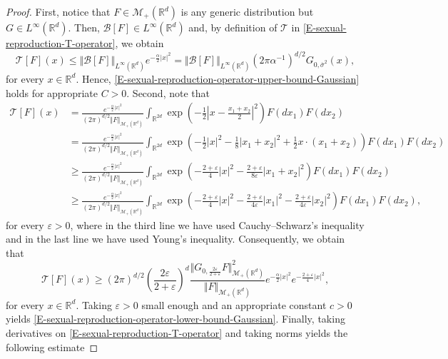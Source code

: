 \documentclass[reqno]{amsart}
\numberwithin{equation}{section}
\begin{document}
{\begin{proof} First, notice that $F\in \mathcal{M}_+(\mathbb{R}^d)$ is any generic distribution but $G\in L^\infty(\mathbb{R}^d)$. Then, $\mathcal{B}[F]\in L^\infty(\mathbb{R}^d)$ and, by definition of $\mathcal{T}$ in \eqref{E-sexual-reproduction-T-operator}, we obtain
$$
\mathcal{T}[F](x)\leq \Vert \mathcal{B}[F]\Vert_{L^\infty(\mathbb{R}^d)} e^{-\frac{\alpha}{2}\vert x\vert^2}= \Vert \mathcal{B}[F]\Vert_{L^\infty(\mathbb{R}^d)}\left(2\pi\alpha^{-1}\right)^{d/2} G_{0,\overline{\sigma}^2}(x),
$$
for every $x\in \mathbb{R}^d$. Hence, \eqref{E-sexual-reproduction-operator-upper-bound-Gaussian} holds for appropriate $C>0$. Second, note that
\begin{align*}
\mathcal{T}[F](x)&=\frac{e^{-\frac{\alpha}{2}\vert x\vert^2}}{(2\pi)^{d/2}\Vert F\Vert_{\mathcal{M}_+(\mathbb{R}^d)}}\int_{\mathbb{R}^{2d}}\exp\left(-\frac{1}{2}\left\vert x-\frac{x_1+x_2}{2}\right\vert^2 \right) F(dx_1)F(dx_2)\\
&=\frac{e^{-\frac{\alpha}{2}\vert x\vert^2}}{(2\pi)^{d/2}\Vert F\Vert_{\mathcal{M}_+(\mathbb{R}^d)}}\int_{\mathbb{R}^{2d}}\exp\left(-\frac{1}{2}\vert x\vert^2-\frac{1}{8}\vert x_1+x_2\vert^2+\frac{1}{2}x\cdot (x_1+x_2)\right)F(dx_1)F(dx_2)\\
&\geq \frac{e^{-\frac{\alpha}{2}\vert x\vert^2}}{(2\pi)^{d/2}\Vert F\Vert_{\mathcal{M}_+(\mathbb{R}^d)}}\int_{\mathbb{R}^{2d}} \exp\left(-\frac{2+\varepsilon}{4}\vert x\vert^2-\frac{2+\varepsilon}{8\varepsilon}\vert x_1+x_2\vert^2\right)F(dx_1)F(dx_2)\\
&\geq \frac{e^{-\frac{\alpha}{2}\vert x\vert^2}}{(2\pi)^{d/2}\Vert F\Vert_{\mathcal{M}_+(\mathbb{R}^d)}}\int_{\mathbb{R}^{2d}} \exp\left(-\frac{2+\varepsilon}{4}\vert x\vert^2-\frac{2+\varepsilon}{4\varepsilon}\vert x_1\vert^2-\frac{2+\varepsilon}{4\varepsilon}\vert x_2\vert^2\right)F(dx_1)F(dx_2),
\end{align*}
for every $\varepsilon>0$, where in  the third line we have used Cauchy--Schwarz's inequality and in the last line we have used Young's inequality. Consequently, we obtain that
$$
\mathcal{T}[F](x)\geq (2\pi)^{d/2}\left(\frac{2\varepsilon}{2+\varepsilon}\right)^d\frac{\Vert G_{0,\frac{2\varepsilon}{2+\varepsilon}}F\Vert_{\mathcal{M}_+(\mathbb{R}^d)}^2}{\Vert F\Vert_{\mathcal{M}_+(\mathbb{R}^d)}} e^{-\frac{\alpha}{2}\vert x\vert^2}e^{-\frac{2+\varepsilon}{4}\vert x\vert^2},
$$
for every $x\in \mathbb{R}^d$. Taking $\varepsilon>0$ small enough and an appropriate constant $c>0$ yields \eqref{E-sexual-reproduction-operator-lower-bound-Gaussian}. Finally, taking derivatives on \eqref{E-sexual-reproduction-T-operator} and taking norms yields the following estimate

\end{proof}}
\end{document}
